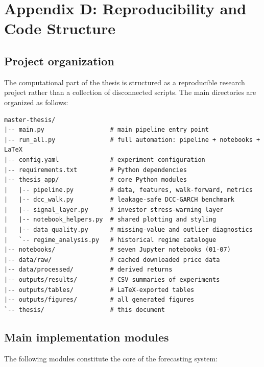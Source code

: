 \section{Appendix D: Reproducibility and Code Structure}

\subsection{Project organization}

The computational part of the thesis is structured as a reproducible research project rather than a collection of disconnected scripts. The main directories are organized as follows:

\begin{lstlisting}[language={}, caption={Top-level project directory structure.}, label=lst:dirstructure]
master-thesis/
|-- main.py                  # main pipeline entry point
|-- run_all.py               # full automation: pipeline + notebooks + LaTeX
|-- config.yaml              # experiment configuration
|-- requirements.txt         # Python dependencies
|-- thesis_app/              # core Python modules
|   |-- pipeline.py          # data, features, walk-forward, metrics
|   |-- dcc_walk.py          # leakage-safe DCC-GARCH benchmark
|   |-- signal_layer.py      # investor stress-warning layer
|   |-- notebook_helpers.py  # shared plotting and styling
|   |-- data_quality.py      # missing-value and outlier diagnostics
|   `-- regime_analysis.py   # historical regime catalogue
|-- notebooks/               # seven Jupyter notebooks (01-07)
|-- data/raw/                # cached downloaded price data
|-- data/processed/          # derived returns
|-- outputs/results/         # CSV summaries of experiments
|-- outputs/tables/          # LaTeX-exported tables
|-- outputs/figures/         # all generated figures
`-- thesis/                  # this document
\end{lstlisting}

\subsection{Main implementation modules}

The following modules constitute the core of the forecasting system:

